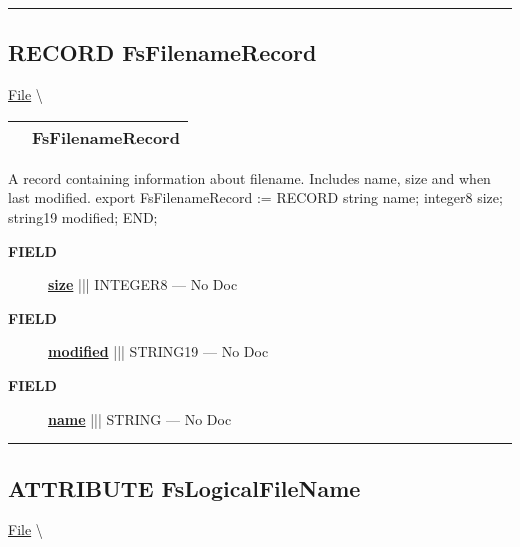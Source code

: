 \rule{\linewidth}{0.5pt}

\subsection*{\textsf{\colorbox{headtoc}{\color{white} RECORD}
FsFilenameRecord}}

\hypertarget{ecldoc:file.fsfilenamerecord}{}
\hspace{0pt} \hyperlink{ecldoc:File}{File} \textbackslash 

{\renewcommand{\arraystretch}{1.5}
\begin{tabularx}{\textwidth}{|>{\raggedright\arraybackslash}l|X|}
\hline
\hspace{0pt}\mytexttt{\color{red} } & \textbf{FsFilenameRecord} \\
\hline
\end{tabularx}
}

\par





A record containing information about filename. Includes name, size and when last modified. export FsFilenameRecord := RECORD string name; integer8 size; string19 modified; END;







\par
\begin{description}
\item [\colorbox{tagtype}{\color{white} \textbf{\textsf{FIELD}}}] \textbf{\underline{size}} ||| INTEGER8 --- No Doc
\item [\colorbox{tagtype}{\color{white} \textbf{\textsf{FIELD}}}] \textbf{\underline{modified}} ||| STRING19 --- No Doc
\item [\colorbox{tagtype}{\color{white} \textbf{\textsf{FIELD}}}] \textbf{\underline{name}} ||| STRING --- No Doc
\end{description}





\rule{\linewidth}{0.5pt}
\subsection*{\textsf{\colorbox{headtoc}{\color{white} ATTRIBUTE}
FsLogicalFileName}}

\hypertarget{ecldoc:file.fslogicalfilename}{}
\hspace{0pt} \hyperlink{ecldoc:File}{File} \textbackslash 

